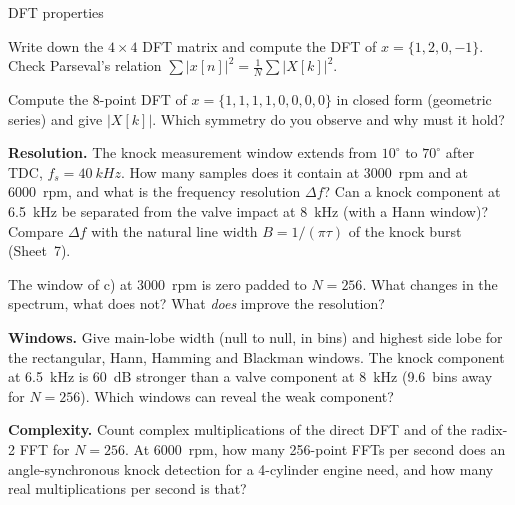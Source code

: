 \begin{exercise}{DFT properties}{\Paper}
\begin{tasks}
  \item Write down the $4\times4$ DFT matrix and compute the DFT of
    $x=\{1,2,0,-1\}$. Check Parseval's relation
    $\sum|x[n]|^2=\frac1N\sum|X[k]|^2$.
  \item Compute the 8-point DFT of $x=\{1,1,1,1,0,0,0,0\}$ in closed form
    (geometric series) and give $|X[k]|$. Which symmetry do you observe and
    why must it hold?
  \item \textbf{Resolution.} The knock measurement window extends from
    $10^\circ$ to $70^\circ$ after TDC, $f_s=\SI{40}{kHz}$. How many samples
    does it contain at \SI{3000}{rpm} and at \SI{6000}{rpm}, and what is the
    frequency resolution $\Delta f$? Can a knock component at \SI{6.5}{kHz} be
    separated from the valve impact at \SI{8}{kHz} (with a Hann window)?
    Compare $\Delta f$ with the natural line width $B=1/(\pi\tau)$ of the knock
    burst (Sheet~7).
  \item The window of c) at \SI{3000}{rpm} is zero padded to $N=256$. What
    changes in the spectrum, what does not? What \emph{does} improve the
    resolution?
  \item \textbf{Windows.} Give main-lobe width (null to null, in bins) and
    highest side lobe for the rectangular, Hann, Hamming and Blackman windows.
    The knock component at \SI{6.5}{kHz} is \SI{60}{dB} stronger than a valve
    component at \SI{8}{kHz} (\SI{9.6}{bins} away for $N=256$). Which windows
    can reveal the weak component?
  \item \textbf{Complexity.} Count complex multiplications of the direct DFT
    and of the radix-2 FFT for $N=256$. At \SI{6000}{rpm}, how many 256-point
    FFTs per second does an angle-synchronous knock detection for a
    4-cylinder engine need, and how many real multiplications per second is
    that?
\end{tasks}
\end{exercise}

